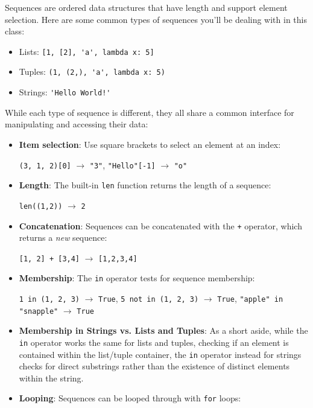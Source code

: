Sequences are ordered data structures that have length and support element selection. Here are some common types of sequences you'll be dealing with in this class: 
\begin{itemize}
	\item Lists: \lstinline{[1, [2], 'a', lambda x: 5]}
	\item Tuples: \lstinline{(1, (2,), 'a', lambda x: 5)}
	\item Strings: \lstinline{'Hello World!'}
\end{itemize}

While each type of sequence is different, they all share a common interface for manipulating and accessing their data: 
\begin{itemize}
\item \textbf{Item selection}: Use square brackets to select an element at an index: 
	
\lstinline{(3, 1, 2)[0]} $\rightarrow$ \lstinline{"3"}, \quad \lstinline{"Hello"[-1]} $\rightarrow$ \lstinline{"o"}

\item\textbf{Length}: The built-in \lstinline{len} function returns the length of a sequence: 
	
\lstinline{len((1,2))} $\rightarrow$ \lstinline{2}

\item \textbf{Concatenation}: Sequences can be concatenated with the \lstinline{+} operator, which returns a \textit{new} sequence:

\lstinline{[1, 2] + [3,4]} $\rightarrow$ \lstinline{[1,2,3,4]}

\item \textbf{Membership}: The \lstinline{in} operator tests for sequence membership: 

\lstinline{1 in (1, 2, 3)} $\rightarrow$ \lstinline{True}, \quad \lstinline{5 not in (1, 2, 3)} $\rightarrow$ \lstinline{True}, \quad \lstinline{"apple" in "snapple"} $\rightarrow$ \lstinline{True}

\item \textbf{Membership in Strings vs. Lists and Tuples}: As a short aside, while the \lstinline{in} operator works the same for lists and tuples, checking if an element is contained within the list/tuple container, the \lstinline{in} operator instead for strings checks for direct substrings rather than the existence of distinct elements within the string.

\item \textbf{Looping}: Sequences can be looped through with \lstinline{for} loops:


\end{itemize}
